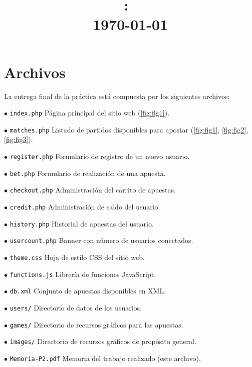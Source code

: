 \documentclass{article}
\title{
    \vspace{2in}
    \textmd{\textbf{\hmwkClass:\ \hmwkTitle}}\\
    \normalsize\vspace{0.1in}\small{\today}\\
    \vspace{3in}
}
\author{\textbf{\hmwkAuthorName}}
\date{} %
\begin{document}
\maketitle



\newpage
\tableofcontents
\newpage

\section{Archivos}
La entrega final de la práctica está compuesta por los siguientes archivos:
\begin{ldescription}
\item[$\bullet$ \texttt{index.php}]
    Página principal del sitio web ({\small\autoref{fig:fig1}}).
\item[$\bullet$ \texttt{matches.php}]
    Listado de partidos disponibles para apostar ({\small\autoref{fig:fig1}, \autoref{fig:fig2}, \autoref{fig:fig3}}).
\item[$\bullet$ \texttt{register.php}]
    Formulario de registro de un nuevo usuario.
\item[$\bullet$ \texttt{bet.php}]
    Formulario de realización de una apuesta.
\item[$\bullet$ \texttt{checkout.php}]
    Administración del carrito de apuestas.
\item[$\bullet$ \texttt{credit.php}]
    Administración de saldo del usuario.
\item[$\bullet$ \texttt{history.php}]
    Historial de apuestas del usuario.
\item[$\bullet$ \texttt{usercount.php}]
    Banner con número de usuarios conectados.
\item[$\bullet$ \texttt{theme.css}]
    Hoja de estilo CSS del sitio web.
\item[$\bullet$ \texttt{functions.js}]
    Librería de funciones JavaScript.
\item[$\bullet$ \texttt{db.xml}]
    Conjunto de apuestas disponibles en XML.
\item[$\bullet$ \texttt{users/}]
    Directorio de datos de los usuarios.
\item[$\bullet$ \texttt{games/}]
    Directorio de recursos gráficos para las apuestas.
\item[$\bullet$ \texttt{images/}]
    Directorio de recursos gráficos de propósito general.
\item[$\bullet$ \texttt{Memoria-P2.pdf}]
    Memoria del trabajo realizado (este archivo).
\end{ldescription}
\newpage
\end{document}
